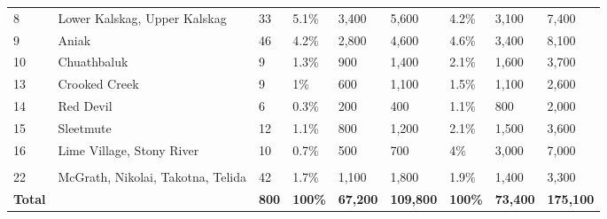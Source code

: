 \documentclass[12pt,]{book}
\theoremstyle{definition}
\theoremstyle{definition}
\theoremstyle{definition}
\theoremstyle{remark}
\begin{document}
\begin{landscape}
\begin{table}
\begin{tabular}[t]{lllllllll}
\addlinespace[0.3em]
\hline
\multicolumn{9}{l}{\textbf{Middle River}}\\
\hline
\hspace{1em}8 & Lower Kalskag, Upper Kalskag & 33 & 5.1\% & 3,400 & 5,600 & 4.2\% & 3,100 & 7,400\\
\hspace{1em}9 & Aniak & 46 & 4.2\% & 2,800 & 4,600 & 4.6\% & 3,400 & 8,100\\
\hspace{1em}10 & Chuathbaluk & 9 & 1.3\% & 900 & 1,400 & 2.1\% & 1,600 & 3,700\\
\hspace{1em}13 & Crooked Creek & 9 & 1\% & 600 & 1,100 & 1.5\% & 1,100 & 2,600\\
\hspace{1em}14 & Red Devil & 6 & 0.3\% & 200 & 400 & 1.1\% & 800 & 2,000\\
\hspace{1em}15 & Sleetmute & 12 & 1.1\% & 800 & 1,200 & 2.1\% & 1,500 & 3,600\\
\hspace{1em}16 & Lime Village, Stony River & 10 & 0.7\% & 500 & 700 & 4\% & 3,000 & 7,000\\
\addlinespace[0.3em]
\hline
\multicolumn{9}{l}{\textbf{Upper River}}\\
\hline
\hspace{1em}22 & McGrath, Nikolai, Takotna, Telida & 42 & 1.7\% & 1,100 & 1,800 & 1.9\% & 1,400 & 3,300\\
\textbf{\hspace{1em}Total} & \textbf{} & \textbf{800} & \textbf{100\%} & \textbf{67,200} & \textbf{109,800} & \textbf{100\%} & \textbf{73,400} & \textbf{175,100}\\
\bottomrule
\end{tabular}
\end{table}
\end{landscape}

\clearpage
\end{document}
